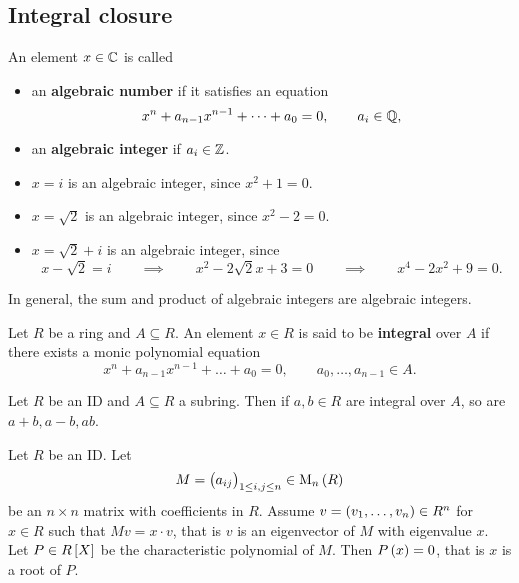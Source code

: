\pagebreak

\subsection{Integral closure}

\begin{definition}
An element $ x \in \mathbb{C} $ is called
\begin{itemize}
\item an \textbf{algebraic number} if it satisfies an equation
$$ x^n + a_{n - 1}x^{n - 1} + \dots + a_0 = 0, \qquad a_i \in \mathbb{Q}, $$
\item an \textbf{algebraic integer} if $ a_i \in \mathbb{Z} $.
\end{itemize}
\end{definition}

\begin{example*}
\hfill
\begin{itemize}
\item $ x = i $ is an algebraic integer, since $ x^2 + 1 = 0 $.
\item $ x = \sqrt{2} $ is an algebraic integer, since $ x^2 - 2 = 0 $.
\item $ x = \sqrt{2} + i $ is an algebraic integer, since
$$ x - \sqrt{2} = i \qquad \implies \qquad x^2 - 2\sqrt{2}x + 3 = 0 \qquad \implies \qquad x^4 - 2x^2 + 9 = 0. $$
\end{itemize}
\end{example*}

In general, the sum and product of algebraic integers are algebraic integers.

\begin{definition}
Let $ R $ be a ring and $ A \subseteq R $. An element $ x \in R $ is said to be \textbf{integral} over $ A $ if there exists a monic polynomial equation
$$ x^n + a_{n - 1}x^{n - 1} + \dots + a_0 = 0, \qquad a_0, \dots, a_{n - 1} \in A. $$
\end{definition}

\begin{theorem}
\label{thm:integralsubring}
Let $ R $ be an ID and $ A \subseteq R $ a subring. Then if $ a, b \in R $ are integral over $ A $, so are $ a + b, a - b, ab $.
\end{theorem}

\begin{lemma}
\label{lem:cayleyhamilton}
Let $ R $ be an ID. Let
$$ M = \br{a_{ij}}_{1 \le i, j \le n} \in \M_n\br{R} $$
be an $ n \times n $ matrix with coefficients in $ R $. Assume $ v = \br{v_1, \dots, v_n} \in R^n $ for $ x \in R $ such that $ Mv = x \cdot v $, that is $ v $ is an eigenvector of $ M $ with eigenvalue $ x $. Let $ P \in R\sbr{X} $ be the characteristic polynomial of $ M $. Then $ P\br{x} = 0 $, that is $ x $ is a root of $ P $.
\end{lemma}

